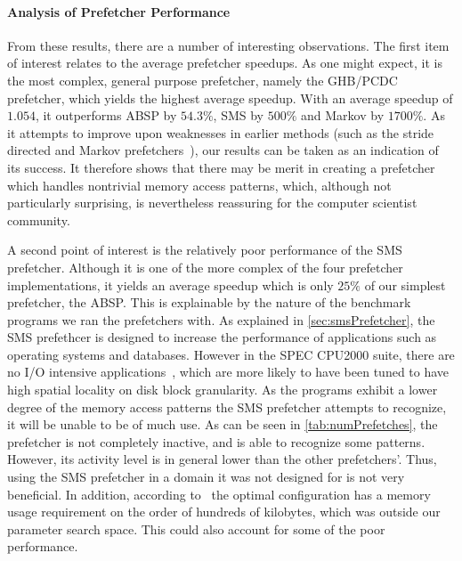 
\paragraph{Analysis of Prefetcher Performance}
\label{par:varprefperf}



From these results, there are a number of interesting
observations. The first item of interest relates to the average
prefetcher speedups. As one might expect, it is the most complex,
general purpose prefetcher, namely the GHB/PCDC prefetcher, which
yields the highest average speedup. With an average speedup of
$1.054$, it outperforms ABSP by $54.3\%$, SMS by $500\%$ and Markov by
$1700\%$. As it attempts to improve upon weaknesses in earlier methods
(such as the stride directed and Markov prefetchers~\cite{Nesbit}),
our results can be taken as an indication of its success. It therefore
shows that there may be merit in creating a prefetcher which handles
nontrivial memory access patterns, which, although not particularly
surprising, is nevertheless reassuring for the computer scientist
community.%

A second point of interest is the relatively poor performance of the
SMS prefetcher. Although it is one of the more complex of the four
prefetcher implementations, it yields an average speedup which is only
$25\%$ of our simplest prefetcher, the ABSP. This is explainable by
the nature of the benchmark programs we ran the prefetchers with. As
explained in \autoref{sec:smsPrefetcher}, the SMS prefethcer is
designed to increase the performance of applications such as operating
systems and databases. However in the SPEC CPU2000 suite, there are no
I/O intensive applications~\cite{SPECFAQ}, which are more likely to
have been tuned to have high spatial locality on disk block
granularity. As the programs exhibit a lower degree of the memory
access patterns the SMS prefetcher attempts to recognize, it will be
unable to be of much use. As can be seen in
\autoref{tab:numPrefetches}, the prefetcher is not completely
inactive, and is able to recognize some patterns. However, its
activity level is in general lower than the other prefetchers'. Thus,
using the SMS prefetcher in a domain it was not designed for is not
very beneficial. In addition, according to~\cite{SMS} the optimal
configuration has a memory usage requirement on the order of hundreds
of kilobytes, which was outside our parameter search space. This could
also account for some of the poor performance.

